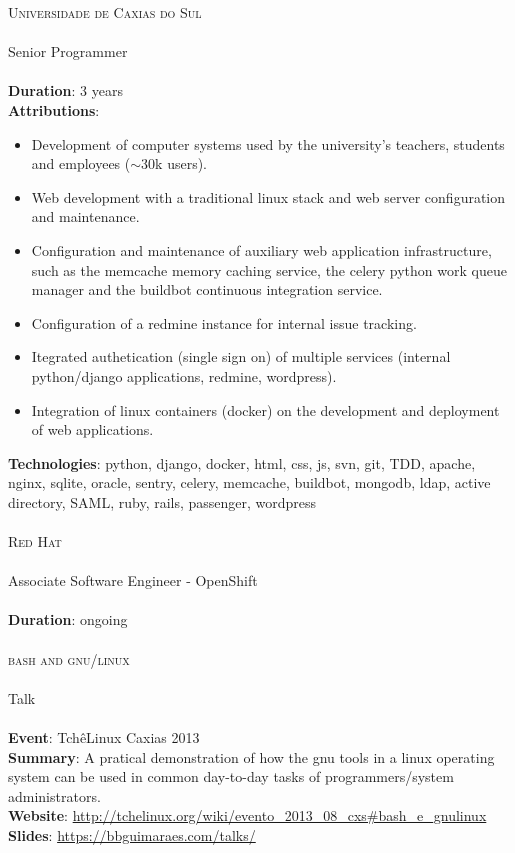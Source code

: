 \noindent
\textsc{\Large Universidade de Caxias do Sul} \\\\
Senior Programmer \\\\
\textbf{Duration}: 3 years\\
\textbf{Attributions}:
    \begin{itemize}
            \vspace{-2.5mm}
            \itemsep-1mm
        \item Development of computer systems used by the university's
            teachers, students and employees ($\sim$30k users).
        \item Web development with a traditional linux stack and web server
            configuration and maintenance.
        \item Configuration and maintenance of auxiliary web application
            infrastructure, such as the memcache memory caching service, the
            celery python work queue manager and the buildbot continuous
            integration service.
        \item Configuration of a redmine instance for internal issue tracking.
        \item Itegrated authetication (single sign on) of multiple services
            (internal python/django applications, redmine, wordpress).
        \item Integration of linux containers (docker) on the development and
            deployment of web applications.
    \end{itemize}
\textbf{Technologies}:
    python, django, docker, html, css, js, svn, git, TDD, apache, nginx,
    sqlite, oracle, sentry, celery, memcache, buildbot, mongodb, ldap, active
    directory, SAML, ruby, rails, passenger, wordpress \\\\

\noindent
\textsc{\Large Red Hat} \\\\
Associate Software Engineer - OpenShift \\\\
\textbf{Duration}: ongoing \\\\

\noindent
\textsc{\Large bash and gnu/linux} \\\\
Talk \\\\
\textbf{Event}: TchêLinux Caxias  2013 \\
\textbf{Summary}:
    A pratical demonstration of how the gnu tools in a linux operating system
    can be used in common day-to-day tasks of programmers/system
    administrators. \\
\textbf{Website}:
    \url{http://tchelinux.org/wiki/evento_2013_08_cxs#bash_e_gnulinux} \\
\textbf{Slides}: \url{https://bbguimaraes.com/talks/} \\\\


